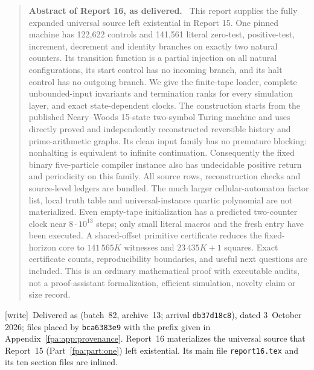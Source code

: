 \documentclass[11pt,a4paper]{article}
\numberwithin{equation}{section}
\newcommand{\wtag}{\textup{[write]}}
\newenvironment{reportabstract}[1]{\begin{quote}\small\textbf{Abstract of Report #1, as delivered.}\ }{\end{quote}}
\begin{document}
\begin{reportabstract}{16}
This report supplies the fully expanded universal source left existential in
Report 15. One pinned machine has 122,622 controls and 141,561 literal
zero-test, positive-test, increment, decrement and identity branches on exactly
two natural counters. Its transition function is a partial injection on all
natural configurations, its start control has no incoming branch, and its halt
control has no outgoing branch. We give the finite-tape loader, complete
unbounded-input invariants and termination ranks for every simulation layer,
and exact state-dependent clocks. The construction starts from the published
Neary--Woods 15-state two-symbol Turing machine and uses directly proved and
independently reconstructed reversible history and prime-arithmetic graphs.
Its clean input family has no premature blocking: nonhalting is equivalent to
infinite continuation. Consequently the fixed binary five-particle compiler
instance also has undecidable positive return and periodicity on this family.
All source rows, reconstruction checks and source-level ledgers are bundled.
The much larger cellular-automaton factor list, local truth table and
universal-instance quartic polynomial are not materialized. Even empty-tape
initialization has a predicted two-counter clock near $8\cdot10^{13}$ steps;
only small literal macros and the fresh entry have been executed. A shared-offset primitive certificate reduces the fixed-horizon core to
$141\,565K$ witnesses and $23\,435K+1$ squares. Exact
certificate counts, reproducibility boundaries, and useful next questions are
included. This is an ordinary mathematical proof with executable audits, not
a proof-assistant formalization, efficient simulation, novelty claim or size
record.
\end{reportabstract}

\wtag\ Delivered as  (batch~82, archive~13; arrival \texttt{db37d18c8}), dated 3~October 2026; files placed by \texttt{bca6383e9} with the prefix given in Appendix~\ref{fpa:app:provenance}. Report~16 materializes the universal source that Report~15 (Part~\ref{fpa:part:one}) left existential. Its main file \texttt{report16.tex} and its ten section files are inlined.
\end{document}
